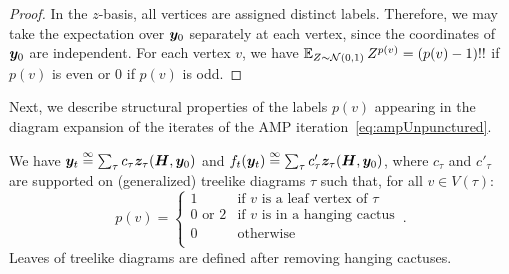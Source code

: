 \begin{proof}        
    In the $z$-basis, all vertices are assigned distinct labels.
    Therefore, we may take the expectation over ${\bm y}_0$ separately at each vertex, since the coordinates of ${\bm y}_0$ are independent. For each vertex $v$, we have $\operatorname*{\mathbb{E}}_{Z \sim {\cal N}(0,1)} Z^{p(v)} = (p(v)-1)!!$ if $p(v)$ is even or $0$ if $p(v)$ is odd.
\end{proof}

Next, we describe structural properties of the labels $p(v)$ appearing in the diagram expansion of the iterates of the AMP iteration~\cref{eq:ampUnpunctured}.

\begin{lemma}\label{claim:initialization-structure}
    We have
    ${\bm y}_t \overset{\infty}{=} \sum_{\tau} c_\tau {\bm z}_\tau({\bm H}, \bm y_0)$ and $f_t(\bm y_t) \overset{\infty}{=} \sum_{\tau} c'_\tau {\bm z}_\tau({\bm H}, \bm y_0)$,
    where $c_\tau$ and $c'_\tau$ are supported on (generalized) treelike diagrams $\tau$ such that,
    for all $v \in V(\tau)$: 
    \[
        p(v) = \begin{cases}
            1 & \text{if $v$ is a leaf vertex of $\tau$}\\
            0\text{ or } 2 & \text{if $v$ is in a hanging cactus}\\
            0 & \text{otherwise}\\
        \end{cases}\,.
    \] 
    Leaves of treelike diagrams are defined after
    removing hanging cactuses.
\end{lemma}


